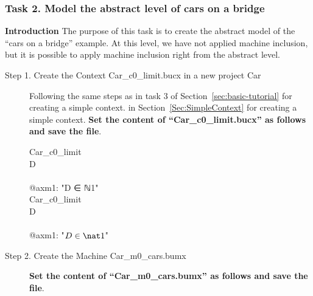 \subsubsection{Task 2. Model the abstract level of cars on a bridge}
\textbf{Introduction} The purpose of this task is to create the abstract model of the ``cars on a bridge'' example. At this level, we have not applied machine inclusion, but it is possible to apply machine inclusion right from the abstract level. 
\begin{description}
	\item[Step 1. Create the Context Car\_c0\_limit.bucx in a new project Car] 
	Following the same steps as 
	\ifplastex
	in task 3 of Section~\ref{sec:basic-tutorial} for creating a simple context.  
	\else
	in Section~\ref{Sec:SimpleContext} for creating a simple context.
	\fi
	\textbf{Set the content of ``Car\_c0\_limit.bucx'' as follows and save the file}.
	  
	  \begin{center}
		\begin{Bcode}
			\ifplastex
			\Bcontext{} Car\_c0_limit\\
			\Bconstants{} D\\
			\Baxioms\\
			@axm1: "D ∈ ℕ1"\\
			\Bend
			\else
			\Bcontext{} Car_c0_limit\\
			\Bconstants{} D\\
			\Baxioms\\
			\Btab @axm1: "\(D \in \nat1\)"\\
			\Bend
			\fi
		\end{Bcode}
	\end{center}
	\item[Step 2. Create the Machine Car\_m0\_cars.bumx]\textbf{Set the content of ``Car\_m0\_cars.bumx'' as follows and save the file}.


\end{description}
